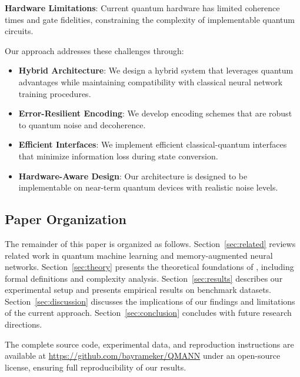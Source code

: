 \textbf{Hardware Limitations}: Current quantum hardware has limited coherence times and gate fidelities, constraining the complexity of implementable quantum circuits.

Our approach addresses these challenges through:

\begin{itemize}
    \item \textbf{Hybrid Architecture}: We design a hybrid system that leverages quantum advantages while maintaining compatibility with classical neural network training procedures.
    
    \item \textbf{Error-Resilient Encoding}: We develop encoding schemes that are robust to quantum noise and decoherence.
    
    \item \textbf{Efficient Interfaces}: We implement efficient classical-quantum interfaces that minimize information loss during state conversion.
    
    \item \textbf{Hardware-Aware Design}: Our architecture is designed to be implementable on near-term quantum devices with realistic noise levels.
\end{itemize}

\subsection{Paper Organization}

The remainder of this paper is organized as follows. Section~\ref{sec:related} reviews related work in quantum machine learning and memory-augmented neural networks. Section~\ref{sec:theory} presents the theoretical foundations of \qmann, including formal definitions and complexity analysis. Section~\ref{sec:results} describes our experimental setup and presents empirical results on benchmark datasets. Section~\ref{sec:discussion} discusses the implications of our findings and limitations of the current approach. Section~\ref{sec:conclusion} concludes with future research directions.

The complete source code, experimental data, and reproduction instructions are available at \url{https://github.com/bayrameker/QMANN} under an open-source license, ensuring full reproducibility of our results.
